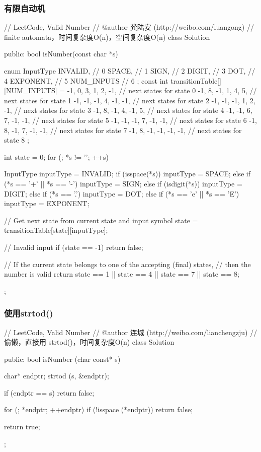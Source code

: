 \subsubsection{有限自动机}
\begin{Code}
	// LeetCode, Valid Number
	// @author 龚陆安 (http://weibo.com/luangong)
	// finite automata，时间复杂度O(n)，空间复杂度O(n)
	class Solution {
		public:
		bool isNumber(const char *s) {
			enum InputType {
				INVALID,    // 0
				SPACE,      // 1
				SIGN,       // 2
				DIGIT,      // 3
				DOT,        // 4
				EXPONENT,   // 5
				NUM_INPUTS  // 6
			};
			const int transitionTable[][NUM_INPUTS] = {
				-1, 0, 3, 1, 2, -1, // next states for state 0
				-1, 8, -1, 1, 4, 5,     // next states for state 1
				-1, -1, -1, 4, -1, -1,     // next states for state 2
				-1, -1, -1, 1, 2, -1,     // next states for state 3
				-1, 8, -1, 4, -1, 5,     // next states for state 4
				-1, -1, 6, 7, -1, -1,     // next states for state 5
				-1, -1, -1, 7, -1, -1,     // next states for state 6
				-1, 8, -1, 7, -1, -1,     // next states for state 7
				-1, 8, -1, -1, -1, -1,     // next states for state 8
			};
			
			int state = 0;
			for (; *s != '\0'; ++s) {
				InputType inputType = INVALID;
				if (isspace(*s))
				inputType = SPACE;
				else if (*s == '+' || *s == '-')
				inputType = SIGN;
				else if (isdigit(*s))
				inputType = DIGIT;
				else if (*s == '.')
				inputType = DOT;
				else if (*s == 'e' || *s == 'E')
				inputType = EXPONENT;
				
				// Get next state from current state and input symbol
				state = transitionTable[state][inputType];
				
				// Invalid input
				if (state == -1) return false;
			}
			// If the current state belongs to one of the accepting (final) states,
			// then the number is valid
			return state == 1 || state == 4 || state == 7 || state == 8;
			
		}
	};
\end{Code}


\subsubsection{使用strtod()}
\begin{Code}
	// LeetCode, Valid Number
	// @author 连城 (http://weibo.com/lianchengzju)
	// 偷懒，直接用 strtod()，时间复杂度O(n)
	class Solution {
		public:
		bool isNumber (char const* s) {
			char* endptr;
			strtod (s, &endptr);
			
			if (endptr == s) return false;
			
			for (; *endptr; ++endptr)
			if (!isspace (*endptr)) return false;
			
			return true;
		}
	};
\end{Code}



